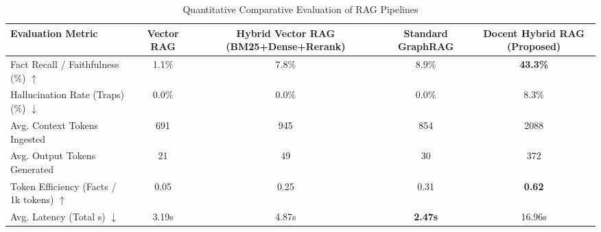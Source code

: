 \begin{table}[htbp]
\centering
\caption{Quantitative Comparative Evaluation of RAG Pipelines}
\label{tab:rag_comparison}
\begin{tabular}{l|c|c|c|c}
\hline
\textbf{Evaluation Metric} & \textbf{Vector RAG} & \textbf{Hybrid Vector RAG (BM25+Dense+Rerank)} & \textbf{Standard GraphRAG} & \textbf{Docent Hybrid RAG (Proposed)} \\
\hline
Fact Recall / Faithfulness (\%) $\uparrow$ & 1.1\% & 7.8\% & 8.9\% & \textbf{43.3\%} \\
Hallucination Rate (Traps) (\%) $\downarrow$ & 0.0\% & 0.0\% & 0.0\% & 8.3\% \\
Avg. Context Tokens Ingested & 691 & 945 & 854 & 2088 \\
Avg. Output Tokens Generated & 21 & 49 & 30 & 372 \\
Token Efficiency (Facts / 1k tokens) $\uparrow$ & 0.05 & 0.25 & 0.31 & \textbf{0.62} \\
Avg. Latency (Total s) $\downarrow$ & 3.19s & 4.87s & \textbf{2.47s} & 16.96s \\
\hline
\end{tabular}
\end{table}
